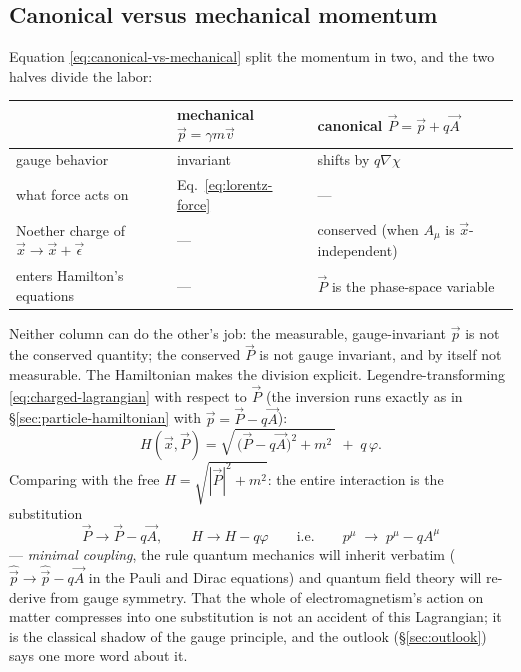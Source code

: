 \documentclass[11pt]{article}
\theoremstyle{plain}
\theoremstyle{definition}
\theoremstyle{remark}
\newcommand{\vx}{\vec{x}}
\newcommand{\vv}{\vec{v}}
\newcommand{\vp}{\vec{p}}
\begin{document}
\subsection{Canonical versus mechanical momentum}
\label{sec:canonical-mechanical}

Equation \eqref{eq:canonical-vs-mechanical} split the momentum in two,
and the two halves divide the labor:
\begin{center}
\begin{tabular}{lll}
\toprule
 & mechanical $\vp = \gamma m\vv$ & canonical $\vec P = \vp + q\vec A$ \\
\midrule
gauge behavior & invariant & shifts by $q\nabla\chi$ \\
what force acts on & Eq.~\eqref{eq:lorentz-force} & --- \\
Noether charge of $\vx \to \vx + \vec\epsilon$ & --- & conserved (when $A_\mu$ is $\vx$-independent) \\
enters Hamilton's equations & --- & $\vec P$ is the phase-space variable \\
\bottomrule
\end{tabular}
\end{center}
Neither column can do the other's job: the measurable, gauge-invariant
$\vp$ is not the conserved quantity; the conserved $\vec P$ is not
gauge invariant, and by itself not measurable. The Hamiltonian makes
the division explicit. Legendre-transforming
\eqref{eq:charged-lagrangian} with respect to $\vec P$ (the inversion
runs exactly as in \S\ref{sec:particle-hamiltonian} with
$\vp = \vec P - q\vec A$):
\begin{equation}
  \boxed{\;
  H(\vx, \vec P)
  = \sqrt{\,\bigl(\vec P - q\vec A\bigr)^2 + m^2\,}
    \;+\; q\,\varphi .
  \;}
  \label{eq:minimal-coupling}
\end{equation}
Comparing with the free
$H = \sqrt{|\vec P|^2 + m^2}$: the entire interaction is the
substitution
\begin{equation}
  \vec P \to \vec P - q\vec A,
  \qquad
  H \to H - q\varphi
  \qquad\text{i.e.}\qquad
  p^\mu \;\to\; p^\mu - qA^\mu
  \label{eq:minimal-substitution}
\end{equation}
--- \emph{minimal coupling}, the rule quantum mechanics will inherit
verbatim ($\hat{\vec p} \to \hat{\vec p} - q\vec A$ in the Pauli and
Dirac equations) and quantum field theory will re-derive from gauge
symmetry. That the whole of electromagnetism's action on matter
compresses into one substitution is not an accident of this
Lagrangian; it is the classical shadow of the gauge principle, and the
outlook (\S\ref{sec:outlook}) says one more word about it.
\end{document}
